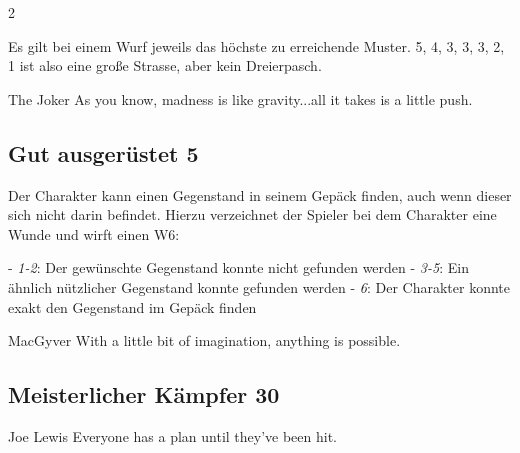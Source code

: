 \begin{multicols}{2}
\begin{tcolorbox}
Es gilt bei einem Wurf jeweils das höchste zu erreichende Muster. 5, 4, 3, 3, 3, 2, 1 ist also eine große Strasse, aber kein Dreierpasch.

\begin{pquote}{The Joker}
As you know, madness is like gravity...all it takes is a little push.
\end{pquote}

\vspace{3mm}



\end{tcolorbox}

\begin{tcolorbox}
    \subsection*{Gut ausgerüstet \hfill \small{5 }}
    \tcblower
Der Charakter kann einen Gegenstand in seinem Gepäck finden, auch wenn dieser sich nicht darin befindet. Hierzu verzeichnet der Spieler bei dem Charakter eine Wunde und wirft einen W6:

-  \textit{1-2}: Der gewünschte Gegenstand konnte nicht gefunden werden
-  \textit{3-5}: Ein ähnlich nützlicher Gegenstand konnte gefunden werden
- \textit{6}: Der Charakter konnte exakt den Gegenstand im Gepäck finden

\begin{pquote}{MacGyver}
With a little bit of imagination, anything is possible.
\end{pquote}

\vspace{3mm}



\end{tcolorbox}

\begin{tcolorbox}
    \subsection*{Meisterlicher Kämpfer \hfill \small{30 }}
    \tcblower


\begin{pquote}{Joe Lewis}
Everyone has a plan until they’ve been hit.
\end{pquote}


\end{tcolorbox}
\end{multicols}
